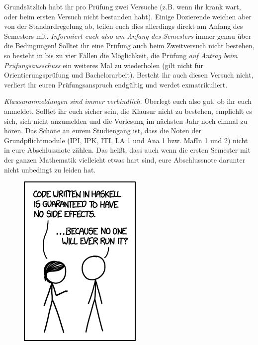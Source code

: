 Grundsätzlich habt ihr pro Prüfung zwei Versuche (z.B. wenn ihr krank wart, oder beim ersten Versuch nicht bestanden habt). Einige Dozierende weichen aber von der Standardregelung ab, teilen euch dies allerdings direkt am Anfang des Semesters mit. \emph{Informiert euch also am Anfang des Semesters} immer genau über die Bedingungen! Solltet ihr eine Prüfung auch beim Zweitversuch nicht bestehen, so besteht in bis zu vier Fällen die Möglichkeit, die Prüfung \emph{auf Antrag beim Prüfungsausschuss} ein weiteres Mal zu wiederholen (gilt nicht für Orientierungsprüfung und Bachelorarbeit). Besteht ihr auch diesen Versuch nicht, verliert ihr euren Prüfungsanspruch endgültig und werdet exmatrikuliert.

\emph{Klausuranmeldungen sind immer verbindlich}. Überlegt euch also gut, ob ihr euch anmeldet. Solltet ihr euch sicher sein, die Klausur nicht zu bestehen, empfiehlt es sich, sich nicht anzumelden und die Vorlesung im nächsten Jahr noch einmal zu hören. Das Schöne an eurem Studiengang ist, dass die Noten der Grundpflichtmodule (IPI, IPK, ITI, LA 1 und Ana 1 bzw. MafIn 1 und 2) nicht in eure Abschlussnote zählen. Das heißt, dass auch wenn die ersten Semester mit der ganzen Mathematik vielleicht etwas hart sind, eure Abschlussnote darunter nicht unbedingt zu leiden hat.

\begin{figure}[h]
\centering
\includegraphics[width=.5\linewidth]{bilder/haskell.png}
\end{figure}

